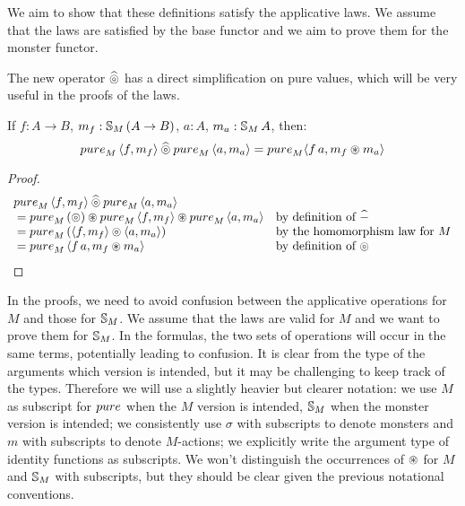 We aim to show that these definitions satisfy the applicative laws.
We assume that the laws are satisfied by the base functor and we aim to prove them for the monster functor.

%

The new operator $\mathbin{\widehat{\circledcirc}}$ has a direct simplification on pure values, which will be very useful in the proofs of the laws.
\begin{lemma}\label{lemma:pappl}
If $f:A\rightarrow B$, $m_f:\mathbb{S}_{M}\,(A\rightarrow B)$, $a:A$, $m_a:\mathbb{S}_{M}\,A$, then:
$$
\apure_M\,\langle f, m_f\rangle \alift{\pappl} \apure_M\,\langle a, m_a\rangle = \apure_M \langle f\,a, m_f \appl m_a \rangle
$$
\end{lemma}
\begin{proof}
$$
\begin{array}{ll}
\apure_M\,\langle f, m_f\rangle \alift{\pappl} \apure_M\,\langle a, m_a\rangle \\
{}= \apure_M\,(\pappl) \appl \apure_M\,\langle f, m_f\rangle \appl \apure_M\,\langle a, m_a\rangle
  & \mbox{by definition of }\alift{-}\\
{}= \apure_M\,(\langle f, m_f\rangle \pappl \langle a, m_a\rangle)
  & \mbox{by the homomorphism law for }M\\
{}= \apure_M\,\langle f\,a, m_f \appl m_a \rangle
  & \mbox{by definition of }\pappl
\end{array}
$$
\end{proof}

In the proofs, we need to avoid confusion between the applicative operations for $M$ and those for $\mathbb{S}_{M}$.
We assume that the laws are valid for $M$ and we want to prove them for $\mathbb{S}_{M}$.
In the formulas, the two sets of operations will occur in the same terms, potentially leading to confusion.
It is clear from the type of the arguments which version is intended, but it may be challenging to keep track of the types.
Therefore we will use a slightly heavier but clearer notation: we use $M$ as subscript for $\apure$ when the $M$ version is intended, $\mathbb{S}_{M}$ when the monster version is intended; we consistently use $\sigma$ with subscripts to denote monsters and $m$ with subscripts to denote $M$-actions; we explicitly write the argument type of identity functions as subscripts.
We won't distinguish the occurrences of $\circledast$ for $M$ and $\mathbb{S}_{M}$ with subscripts, but they should be clear given the previous notational conventions.

